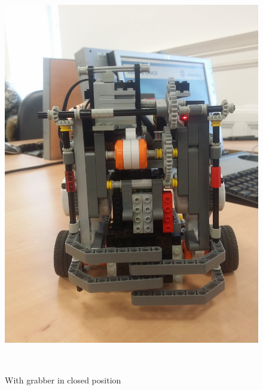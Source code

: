 \documentclass[a4paper,12pt]{article}
\begin{document}
\begin{figure}[ht]
	\centering
	\begin{minipage}[b]{.48\textwidth}
        \centering
		\includegraphics[scale=0.065, angle=-90]{closed_front.jpg}
		\caption{With grabber in closed position}
		\label{fig:closed}
	\end{minipage}
	~
	\begin{minipage}[b]{.48\textwidth}
        \centering

\end{minipage}
\end{figure}
\end{document}
